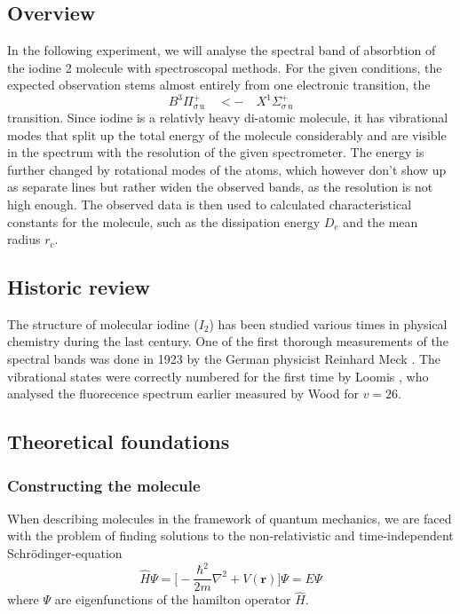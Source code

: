 \subsection{Overview}
In the following experiment, we will analyse the spectral band of absorbtion of the iodine 2 molecule 
with spectroscopal methods. For the given conditions, the expected observation stems almost 
entirely from one electronic transition, the 
\begin{equation}
    B ^3\Pi_{\sigma \, \mathrm{u}}^{+} \quad <- \quad X ^1\Sigma_{\sigma \, \mathrm{u}}^{+}
\end{equation}
transition. Since iodine is a relativly heavy di-atomic molecule, it has vibrational modes that 
split up the total energy of the molecule considerably and are visible in the spectrum with the 
resolution of the given spectrometer. The energy is further changed by rotational modes of the 
atoms, which however don't show up as separate lines but rather widen the observed bands, as the 
resolution is not high enough. 
The observed data is then used to calculated characteristical constants for the molecule, such as 
the dissipation energy $D_e$ and the mean radius $r_c$. 

\subsection{Historic review}
The structure of molecular iodine ($I_2$) has been studied various times in physical chemistry 
during the last century. One of the first thorough measurements of the spectral bands was done in 
1923 by the German physicist Reinhard Meck \cite{mecke1923bandenspektrum}. The vibrational states 
were correctly numbered for the first time by Loomis \cite{loomis1927correlation}, who analysed 
the fluorecence spectrum earlier measured by Wood \cite{wood1911} for $v = 26$.

\subsection{Theoretical foundations}
\subsubsection{Constructing the molecule}
When describing molecules in the framework of quantum mechanics, we are faced with the problem of 
finding solutions to the non-relativistic and time-independent Schrödinger-equation
\begin{equation}
    \hat{H} \Psi = \Big[- \frac{\hbar^2}{2m} \nabla^2 + V(\mathbf{r}) \Big] \Psi = E \Psi
\end{equation}
where $\Psi$ are eigenfunctions of the hamilton operator $\hat{H}$.

